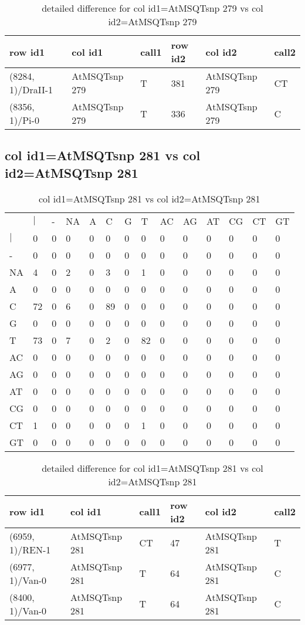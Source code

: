 \begin{center}
\begin{longtable}{|l|l|l|l|l|l|}
\caption{detailed difference for col id1=AtMSQTsnp 279 vs col id2=AtMSQTsnp 279} \label{table_dm821}\\
\hline
row id1&col id1&call1&row id2&col id2&call2\\
\hline
(8284, 1)/DraII-1&AtMSQTsnp 279&T&381&AtMSQTsnp 279&CT\\
(8356, 1)/Pi-0&AtMSQTsnp 279&T&336&AtMSQTsnp 279&C\\
\hline
\end{longtable}
\end{center}

\subsection{col id1=AtMSQTsnp 281 vs col id2=AtMSQTsnp 281}
\begin{center}
\begin{longtable}{|l|l|l|l|l|l|l|l|l|l|l|l|l|l|}
\caption{col id1=AtMSQTsnp 281 vs col id2=AtMSQTsnp 281} \label{table_dm822}\\
\hline
\\
\hline
&$|$&-&NA&A&C&G&T&AC&AG&AT&CG&CT&GT\\
$|$&0&0&0&0&0&0&0&0&0&0&0&0&0\\
-&0&0&0&0&0&0&0&0&0&0&0&0&0\\
NA&4&0&2&0&3&0&1&0&0&0&0&0&0\\
A&0&0&0&0&0&0&0&0&0&0&0&0&0\\
C&72&0&6&0&89&0&0&0&0&0&0&0&0\\
G&0&0&0&0&0&0&0&0&0&0&0&0&0\\
T&73&0&7&0&2&0&82&0&0&0&0&0&0\\
AC&0&0&0&0&0&0&0&0&0&0&0&0&0\\
AG&0&0&0&0&0&0&0&0&0&0&0&0&0\\
AT&0&0&0&0&0&0&0&0&0&0&0&0&0\\
CG&0&0&0&0&0&0&0&0&0&0&0&0&0\\
CT&1&0&0&0&0&0&1&0&0&0&0&0&0\\
GT&0&0&0&0&0&0&0&0&0&0&0&0&0\\
\hline
\end{longtable}
\end{center}

\begin{center}
\begin{longtable}{|l|l|l|l|l|l|}
\caption{detailed difference for col id1=AtMSQTsnp 281 vs col id2=AtMSQTsnp 281} \label{table_dm823}\\
\hline
row id1&col id1&call1&row id2&col id2&call2\\
\hline
(6959, 1)/REN-1&AtMSQTsnp 281&CT&47&AtMSQTsnp 281&T\\
(6977, 1)/Van-0&AtMSQTsnp 281&T&64&AtMSQTsnp 281&C\\
(8400, 1)/Van-0&AtMSQTsnp 281&T&64&AtMSQTsnp 281&C\\
\hline
\end{longtable}
\end{center}


